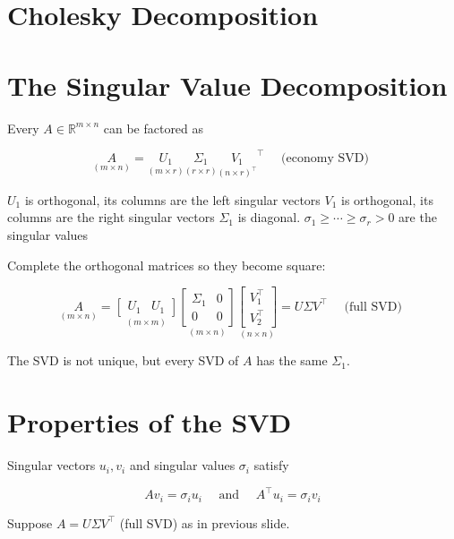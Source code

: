 \documentclass[13pt]{article}
\theoremstyle{definition}
\theoremstyle{remark}
\begin{document}
\section{Cholesky Decomposition}



\headrule

\begin{multicols}{2}
\section{The Singular Value Decomposition}
Every $A \in \mathbb{R}^{m \times n}$ can be factored as

$$
\underset{(m \times n)}{A}=\underset{(m \times r)}{U_{1}} \underset{(r \times r)}{\Sigma_{1}} \underset{(n \times r)^{\top}}{V_{1}}^{\top} \quad \text { (economy SVD) }
$$

$U_{1}$ is orthogonal, its columns are the left singular vectors $V_{1}$ is orthogonal, its columns are the right singular vectors $\Sigma_{1}$ is diagonal. $\sigma_{1} \geq \cdots \geq \sigma_{r}>0$ are the singular values

Complete the orthogonal matrices so they become square:

$$
\underset{(m \times n)}{A}=\underset{(m \times m)}{\begin{bmatrix}
U_{1} & U_{1}
\end{bmatrix}} \underset{(m \times n)}{\begin{bmatrix}
\Sigma_{1} & 0 \\
0 & 0
\end{bmatrix}} \underset{(n \times n)}{\begin{bmatrix}
V_{1}^{\top} \\
V_{2}^{\top}
\end{bmatrix}}=U \Sigma V^{\top} \quad \text { (full SVD) }
$$

The SVD is not unique, but every SVD of $A$ has the same $\Sigma_{1}$.

\section{Properties of the SVD}
Singular vectors $u_{i}, v_{i}$ and singular values $\sigma_{i}$ satisfy

$$
A v_{i}=\sigma_{i} u_{i} \quad \text { and } \quad A^{\top} u_{i}=\sigma_{i} v_{i}
$$

Suppose $A=U \Sigma V^{\top}$ (full SVD) as in previous slide.


\end{multicols}
\end{document}
